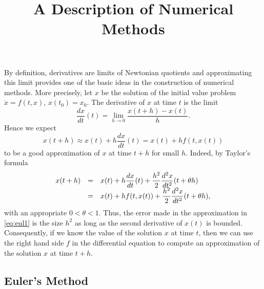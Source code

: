 \documentclass{ximera}
\title{A Description of Numerical Methods}
\begin{document}
\begin{abstract}
\end{abstract}
\maketitle


\label{sec:DNM}

By definition, derivatives are limits of Newtonian quotients and 
approximating this limit provides one of the basic ideas in the 
construction of numerical methods.  More precisely, let $x$ be the 
solution of the initial value problem $\dot x = f(t,x)$, $x(t_0)=x_0$.  
The derivative of $x$ at time $t$ is the limit
\[
\frac{dx}{dt}(t) = \lim_{h\to 0} \frac{x(t+h) - x(t)}{h}.
\]
Hence we expect
\begin{equation}  \label{eq:eul1}
x(t+h) \approx x(t) + h \frac{dx}{dt}(t) = x(t) + h f(t,x(t))
\end{equation}
to be a good approximation of $x$ at time $t+h$ for small $h$.
Indeed, by Taylor's formula
\arraystart
\begin{equation}\label{eq:tfeul}
\begin{array}{rcl}
\displaystyle x(t+h)&=&
\displaystyle x(t)+h\frac{dx}{dt}(t)+\frac{h^2}{2}\frac{d^2x}{dt^2}(t+\theta h)\\
&=& \displaystyle x(t)+hf(t,x(t))+\frac{h^2}{2}\frac{d^2x}{dt^2}(t+\theta h),
\end{array}
\end{equation}
\arrayfinish
with an appropriate $0<\theta<1$.  Thus, the error made in the
approximation in \eqref{eq:eul1} is the size $h^2$
as long as the second derivative of $x(t)$ is bounded.
Consequently, if we know the value of the solution $x$ at time $t$, 
then we can use the right hand side $f$ in the differential equation 
to compute an approximation of the solution $x$ at time $t+h$.

\subsection*{Euler's Method} 
\end{document}
